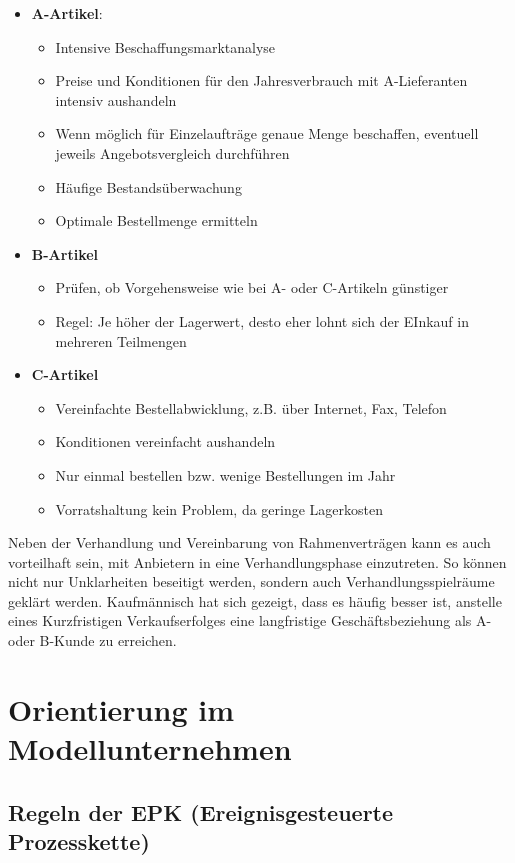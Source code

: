 \documentclass[a4paper, 12pt]{report}
\begin{document}
\begin{multicols}{2}
\begin{itemize}
    \item \textbf{A-Artikel}:
    \begin{itemize}
	\item Intensive Beschaffungsmarktanalyse
	\item Preise und Konditionen für den Jahresverbrauch mit A-Lieferanten
	    intensiv aushandeln
	\item Wenn möglich für Einzelaufträge genaue Menge beschaffen, eventuell
	    jeweils Angebotsvergleich durchführen
	\item Häufige Bestandsüberwachung
	\item Optimale Bestellmenge ermitteln
    \end{itemize}
    \item \textbf{B-Artikel}
    \begin{itemize}
	\item Prüfen, ob Vorgehensweise wie bei A- oder C-Artikeln günstiger
	\item Regel: Je höher der Lagerwert, desto eher lohnt sich der EInkauf
	    in mehreren Teilmengen
    \end{itemize}
    \item \textbf{C-Artikel}
    \begin{itemize}
	\item Vereinfachte Bestellabwicklung, z.B. über Internet, Fax, Telefon
	\item Konditionen vereinfacht aushandeln
	\item Nur einmal bestellen bzw. wenige Bestellungen im Jahr
	\item Vorratshaltung kein Problem, da geringe Lagerkosten
    \end{itemize}
\end{itemize}

Neben der Verhandlung und Vereinbarung von Rahmenverträgen kann es auch
vorteilhaft sein, mit Anbietern in eine Verhandlungsphase einzutreten. So können
nicht nur Unklarheiten beseitigt werden, sondern auch Verhandlungsspielräume
geklärt werden. Kaufmännisch hat sich gezeigt, dass es häufig besser ist,
anstelle  eines Kurzfristigen Verkaufserfolges eine langfristige
Geschäftsbeziehung als A- oder B-Kunde zu erreichen.

\section{Orientierung im Modellunternehmen}

\subsection{Regeln der EPK (Ereignisgesteuerte Prozesskette)}


\end{multicols}
\end{document}
